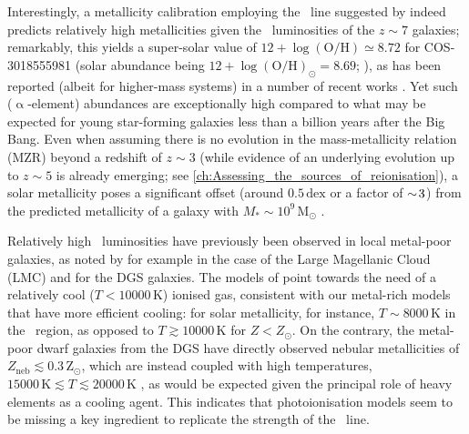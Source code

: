 Interestingly, a metallicity calibration employing the \OIIILam\ line suggested by \citet{2020ApJ...903..150J} indeed predicts relatively high metallicities given the \OIIILam\ luminosities of the $z \sim 7$ galaxies; remarkably, this yields a super-solar value of $12 + \log \left ( \text{O/H} \right) \simeq 8.72$ for COS-3018555981 (solar abundance being $12 + \log \left ( \text{O/H} \right)_\odot = 8.69$; \citealt{2009ARA&A..47..481A}), as has been reported (albeit for higher-mass systems) in a number of recent works \citep[, and references therein]{2022ApJ...928..179L}. Yet such ($\upalpha$-element) abundances are exceptionally high compared to what may be expected for young star-forming galaxies less than a billion years after the Big Bang. Even when assuming there is no evolution in the mass-metallicity relation (MZR) beyond a redshift of $z \sim 3$ (while evidence of an underlying evolution up to $z \sim 5$ is already emerging; see \cref{ch:Assessing_the_sources_of_reionisation}), a solar metallicity poses a significant offset (around $0.5 \, \mathrm{dex}$ or a factor of $\sim \! 3$) from the predicted metallicity of a galaxy with $M_* \sim 10^9 \, \mathrm{M_\odot}$ \citep{2021ApJ...914...19S}.

Relatively high \OIIILam\ luminosities have previously been observed in local metal-poor galaxies, as noted by for example \citet{2012A&A...548A..91L} in the case of the Large Magellanic Cloud (LMC) and \citet{2015A&A...578A..53C, 2019A&A...626A..23C} for the DGS galaxies. The models of \citet{2012A&A...548A..91L} point towards the need of a relatively cool ($T < \num{10000} \, \mathrm{K}$) ionised gas, consistent with our metal-rich models that have more efficient cooling: for solar metallicity, for instance, $T \sim \num{8000} \, \mathrm{K}$ in the \HII\ region, as opposed to $T \gtrsim \num{10000} \, \mathrm{K}$ for $Z < Z_\odot$. On the contrary, the metal-poor dwarf galaxies from the DGS have directly observed nebular metallicities of $Z_\text{neb} \lesssim 0.3 \, \mathrm{Z_\odot}$, which are instead coupled with high temperatures, $\num{15000} \, \mathrm{K} \lesssim T \lesssim \num{20000} \, \mathrm{K}$ \citep[e.g.][]{1990Natur.343..238I, 1997ApJS..108....1I, 1998ApJ...500..188I, 2000ApJ...531..776G}, as would be expected given the principal role of heavy elements as a cooling agent. This indicates that photoionisation models seem to be missing a key ingredient to replicate the strength of the \OIIILam\ line.

